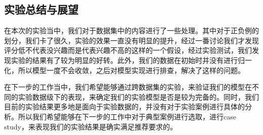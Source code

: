 \subsection{实验总结与展望}
在本次的实验当中，我们对于数据集中的内容进行了一些处理。其中对于正负例的划分，我们卡了很久，实验的效果一直没有明显的提升，经过一番讨论我们才发现评分低不代表没兴趣而是代表兴趣不高的这样的一个假设，经过实验测试，我们发现实验的结果有了较为明显的好转。此外，我们的数据在初始时并没有进行归一化，所以模型一度不会收敛，之后对模型实现进行排查，解决了这样的问题。

在下一步的工作当中，我们希望能够通过跨数据集的实验，来验证我们的模型在不同的实验数据级下的表现，来确定我们的实验模型是否是较为完备的。同时，我们目前的实验结果更多地是面向于实验数据的，并没有对于实验案例进行具体的分析。所以我们希望能够在下一步的工作中对于典型案例进行选取，进行case study，来表现我们的实验结果是确实满足推荐要求的。